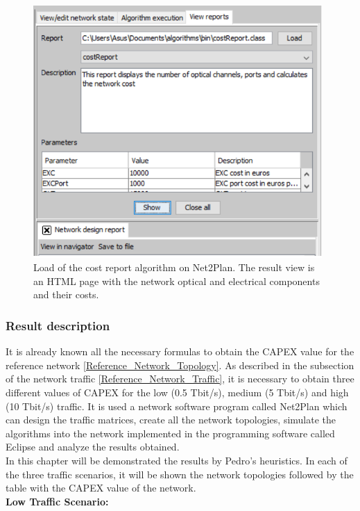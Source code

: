 \begin{figure}[H]
\centering
\includegraphics[width=11cm]{sdf/heuristic/translucent_protection/figures/cost_report_translucent}
\caption{Load of the cost report algorithm on Net2Plan. The result view is an HTML page with the network optical and electrical components and their costs.}
\label{cost_report_translucent_protec}
\end{figure}

\subsubsection{Result description}\label{result_description_translucent_heuristic_protec}

It is already known all the necessary formulas to obtain the CAPEX value for the reference network \ref{Reference_Network_Topology}. As described in the subsection of the network traffic \ref{Reference_Network_Traffic}, it is necessary to obtain three different values of CAPEX for the low (0.5 Tbit/s), medium (5 Tbit/s) and high (10 Tbit/s) traffic. It is used a network software program called Net2Plan which can design the traffic matrices, create all the network topologies, simulate the algorithms into the network implemented in the programming software called Eclipse and analyze the results obtained.\\
In this chapter will be demonstrated the results by Pedro's heuristics. In each of the three traffic scenarios, it will be shown the network topologies followed by the table with the CAPEX value of the network.\\

\noindent
\textbf{Low Traffic Scenario:}\\

